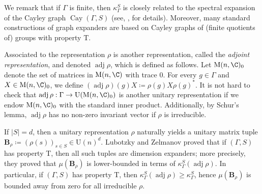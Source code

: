 \documentclass{toc}
\theoremstyle{plain}
\numberwithin{equation}{section}
\theoremstyle{definition}
\DeclareMathOperator\adj{adj}
\newcommand{\ab}[1]{\left\lvert#1\right\rvert}
\newcommand{\M}{\mathrm{M}}
\newcommand{\U}{\mathrm{U}}
\newcommand{\tuple}[1]{\mathbf{#1}}
\newcommand{\vB}{\tuple{B}}
\begin{document}
We remark that if $\Gamma$ is finite, then $\kappa_\Gamma^S$ is closely related to the spectral expansion of the Cayley graph $\operatorname{Cay}(\Gamma,S)$ (see, \eg, \cite{MeshulamWigderson2004} for details). Moreover, many standard constructions of graph expanders are based on Cayley graphs of (finite quotients of) groups with property T.

Associated to the representation $\rho$ is another representation, called the \emph{adjoint representation}, and denoted $\adj \rho$, which is defined as follows. Let $\M(n,\C)_0$ denote the set of matrices in $\M(n,\C)$ with trace $0$. For every $g \in \Gamma$ and $X \in \M(n,\C)_0$, we define $(\adj \rho)(g)X \coloneqq \rho(g)X \rho(g)^*$. It is not hard to check that $\adj \rho:\Gamma \to \U(\M(n,\C)_0)$ is another unitary representation if we endow $\M(n,\C)_0$ with the standard inner product. Additionally, by Schur's lemma, $\adj \rho$ has no non-zero invariant vector if $\rho$ is irreducible.

If $\ab S=d$, then a unitary representation $\rho$ naturally yields a unitary matrix tuple $\vB_\rho\coloneqq (\rho(s))_{s \in S} \in \U(n)^d$. Lubotzky and Zelmanov \cite{LUBOTZKY2008730} proved that if $(\Gamma,S)$ has property T, then all such tuples are dimension expanders; more precisely, they proved that $\mu(\vB_\rho)$ is lower-bounded in terms of $\kappa_\Gamma^S(\adj \rho)$. In particular, if $(\Gamma,S)$ has property T, then $\kappa_\Gamma^S(\adj \rho)\geq \kappa_\Gamma^S$, hence $\mu(\vB_\rho)$ is bounded away from zero for all irreducible $\rho$.
\end{document}
